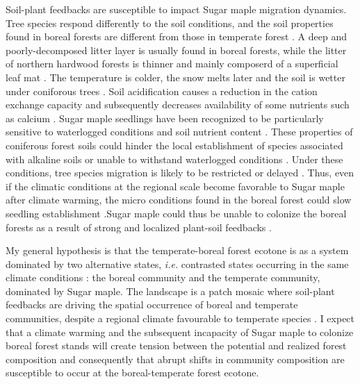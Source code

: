 Soil-plant feedbacks are susceptible to impact Sugar maple migration dynamics. 
Tree species respond differently to the soil conditions, and the soil
properties found in boreal forests are different from those in temperate
forest \cite{Lafleur2010,Barras1998,Goldblum2010,Demers1998}. A deep and poorly-decomposed litter layer is usually found in boreal forests, while the litter of 
northern hardwood forests is thinner and mainly composerd of a superficial leaf
mat \cite{Barras1998}. The temperature is colder, the
snow melts later and the soil is wetter under coniforous trees 
\cite{Lafleur2010,Goldblum2010}. Soil acidification causes a reduction in
the cation exchange capacity and subsequently decreases availability of some
nutrients such as calcium \cite{Moore2008}. Sugar maple seedlings have been
recognized to be particularly sensitive to waterlogged conditions and soil nutrient
content \cite{Moore2008,Lafleur2010,Cleavitt2011}. These properties of
coniferous forest soils could hinder the local establishment of species
associated with alkaline soils or unable to withstand waterlogged conditions
\cite{Lafleur2010}. Under these conditions, tree species migration is
likely to be restricted or delayed \cite{Lafleur2010}. Thus, even if the
climatic conditions at the regional scale become favorable to Sugar maple after climate warming, the micro conditions found in the
boreal forest could slow seedling establishment \cite{Kellman2004,Moore2008,Barras1998,Messier2011}.Sugar maple could thus be unable to colonize the
boreal forests as a result of strong and localized plant-soil feedbacks
\cite{McCarthyNeumann2012}. 

My general hypothesis is that the temperate-boreal forest ecotone
is as a system dominated by two alternative states, \textit{i.e.} contrasted states occurring in the
same climate conditions \cite{scheffer2009critical}:
the boreal community and the temperate community, dominated by Sugar maple. The
landscape is a patch mosaic where soil-plant feedbacks are driving the spatial occurrence of boreal and temperate
communities, despite a regional climate favourable to temperate species
\cite{Goldblum2010,Fisichelli2013}. I expect that a climate warming and the subsequent incapacity of Sugar maple to colonize boreal forest stands will create 
tension between the potential and realized forest composition and consequently that abrupt shifts in
community composition are susceptible to occur at the boreal-temperate forest ecotone.\\

